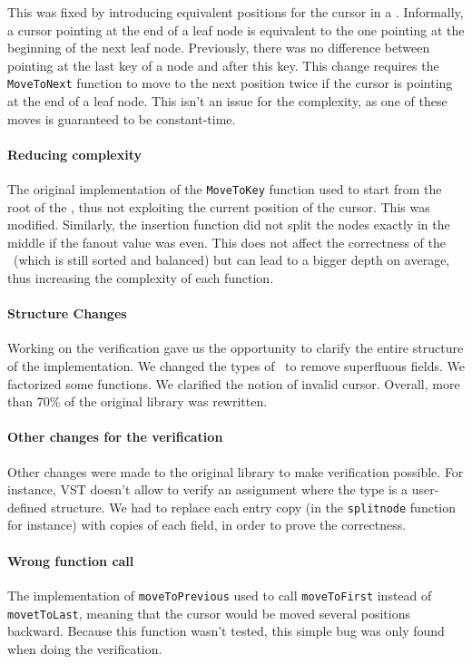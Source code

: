 This was fixed by introducing equivalent positions for the cursor in a \btree.
Informally, a cursor pointing at the end of a leaf node is equivalent to the one pointing at the beginning of the next leaf node.
Previously, there was no difference between pointing at the last key of a node and after this key.
This change requires the \lstinline{MoveToNext} function to move to the next position twice if the cursor is pointing at the end of a leaf node.
This isn't an issue for the complexity, as one of these moves is guaranteed to be constant-time.

\paragraph{Reducing complexity}
The original implementation of the \lstinline{MoveToKey} function used to start from the root of the \btree, thus not exploiting the current position of the cursor. This was modified.
Similarly, the insertion function did not split the nodes exactly in the middle if the fanout value was even.
This does not affect the correctness of the \btree\ (which is still sorted and balanced) but can lead to a bigger depth on average, thus increasing the complexity of each function.

\paragraph{Structure Changes}
Working on the verification gave us the opportunity to clarify the entire structure of the implementation.
We changed the types of \btrees\ to remove superfluous fields. We factorized some functions. We clarified the notion of invalid cursor.
Overall, more than 70\% of the original library was rewritten.

\paragraph{Other changes for the verification}
Other changes were made to the original library to make verification possible.
For instance, VST doesn't allow to verify an assignment where the type is a user-defined structure.
We had to replace each entry copy (in the \lstinline{splitnode} function for instance) with copies of each field, in order to prove the correctness.

\paragraph{Wrong function call} The implementation of \lstinline{moveToPrevious} used to call \lstinline{moveToFirst} instead of \lstinline{movetToLast}, meaning that the cursor would be moved several positions backward.
Because this function wasn't tested, this simple bug was only found when doing the verification.
